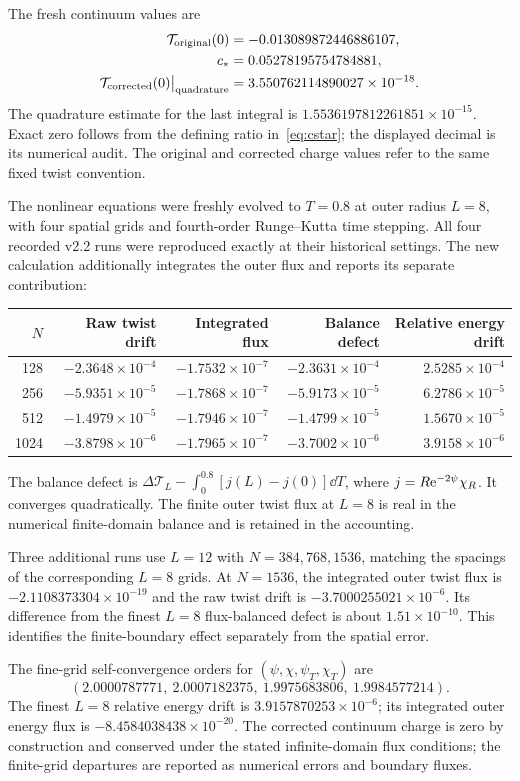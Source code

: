 The fresh continuum values are
\begin{align}
 \mathcal T_{\rm original}(0)&=-0.013089872446886107,\\
 c_*&=0.05278195754784881,\\
 \mathcal T_{\rm corrected}(0)\big|_{\rm quadrature}&=3.550762114890027\times10^{-18}.
\end{align}
The quadrature estimate for the last integral is $1.5536197812261851\times10^{-15}$. Exact zero follows from the defining ratio in~\eqref{eq:cstar}; the displayed decimal is its numerical audit. The original and corrected charge values refer to the same fixed twist convention.

The nonlinear equations were freshly evolved to $T=0.8$ at outer radius $L=8$, with four spatial grids and fourth-order Runge--Kutta time stepping. All four recorded v2.2 runs were reproduced exactly at their historical settings. The new calculation additionally integrates the outer flux and reports its separate contribution:
\begin{center}
\small
\begin{tabular}{@{}rrrrr@{}}
\toprule
$N$ & Raw twist drift & Integrated flux & Balance defect & Relative energy drift \\
\midrule
128 & $-2.3648\times10^{-4}$ & $-1.7532\times10^{-7}$ & $-2.3631\times10^{-4}$ & $2.5285\times10^{-4}$ \\
256 & $-5.9351\times10^{-5}$ & $-1.7868\times10^{-7}$ & $-5.9173\times10^{-5}$ & $6.2786\times10^{-5}$ \\
512 & $-1.4979\times10^{-5}$ & $-1.7946\times10^{-7}$ & $-1.4799\times10^{-5}$ & $1.5670\times10^{-5}$ \\
1024 & $-3.8798\times10^{-6}$ & $-1.7965\times10^{-7}$ & $-3.7002\times10^{-6}$ & $3.9158\times10^{-6}$ \\
\bottomrule
\end{tabular}
\end{center}
The balance defect is $\Delta\mathcal T_L-\int_0^{0.8}[j(L)-j(0)]\dd T$, where $j=R\mathrm e^{-2\psi}\chi_R$. It converges quadratically. The finite outer twist flux at $L=8$ is real in the numerical finite-domain balance and is retained in the accounting.

Three additional runs use $L=12$ with $N=384,768,1536$, matching the spacings of the corresponding $L=8$ grids. At $N=1536$, the integrated outer twist flux is $-2.1108373304\times10^{-19}$ and the raw twist drift is $-3.7000255021\times10^{-6}$. Its difference from the finest $L=8$ flux-balanced defect is about $1.51\times10^{-10}$. This identifies the finite-boundary effect separately from the spatial error.

The fine-grid self-convergence orders for $(\psi,\chi,\psi_T,\chi_T)$ are
\[
 (2.0000787771,\ 2.0007182375,\ 1.9975683806,\ 1.9984577214).
\]
The finest $L=8$ relative energy drift is $3.9157870253\times10^{-6}$; its integrated outer energy flux is $-8.4584038438\times10^{-20}$. The corrected continuum charge is zero by construction and conserved under the stated infinite-domain flux conditions; the finite-grid departures are reported as numerical errors and boundary fluxes.
